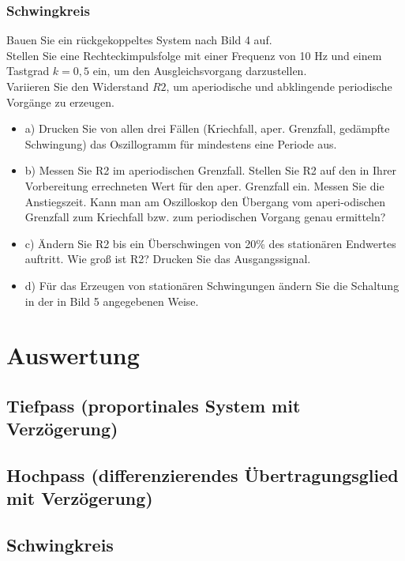 \subsubsection{Schwingkreis}
Bauen Sie ein rückgekoppeltes System nach Bild 4 auf.\\
Stellen Sie eine Rechteckimpulsfolge mit einer Frequenz von 10 Hz und einem Tastgrad $k = 0,5$ ein, um den Ausgleichsvorgang darzustellen.\\ 
Variieren Sie den Widerstand $R2$, um aperiodische und abklingende periodische Vorgänge zu erzeugen.\\
\begin{itemize}
\item 	a) Drucken Sie von allen drei Fällen (Kriechfall, aper. Grenzfall, gedämpfte Schwingung) das Oszillogramm für mindestens eine Periode aus. 
\item	b) Messen Sie R2 im aperiodischen Grenzfall. Stellen Sie R2 auf den in Ihrer Vorbereitung errechneten Wert für den aper. Grenzfall ein.
Messen Sie die Anstiegszeit. Kann man am Oszilloskop den Übergang vom aperi-odischen Grenzfall zum Kriechfall bzw. zum periodischen 
Vorgang genau ermitteln? 
\item 	c) Ändern Sie R2 bis ein Überschwingen von 20\% des stationären Endwertes auftritt. 
Wie groß ist R2? Drucken Sie das Ausgangssignal. 
\item	d) Für das Erzeugen von stationären Schwingungen ändern Sie die Schaltung in der in Bild 5 angegebenen Weise. 
\end{itemize}
\section{Auswertung}
\subsection{Tiefpass (proportinales System mit Verzögerung)}
\subsection{Hochpass (differenzierendes Übertragungsglied mit Verzögerung)}
\subsection{Schwingkreis}

